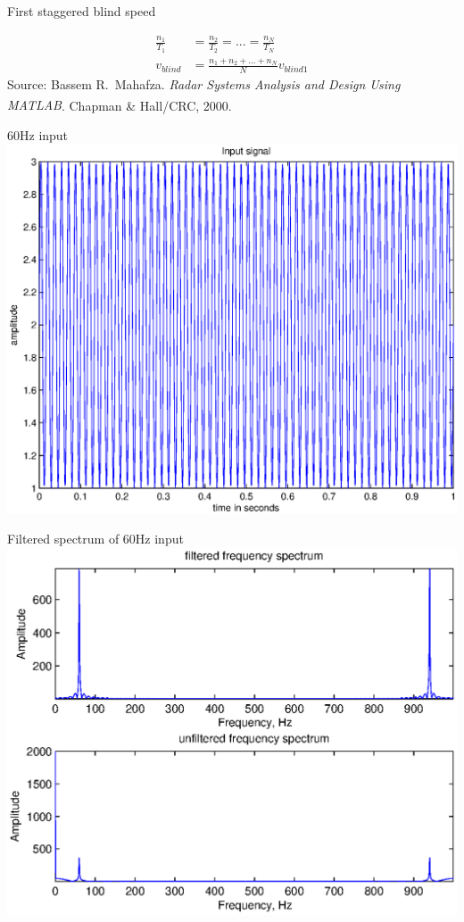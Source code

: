 \documentclass[mathserif]{beamer}
\begin{document}
    \begin{frame}{First staggered blind speed}
      \begin{minipage}[t][0.8\textheight][t]{\textwidth}
	\begin{align}
	  \frac{n_1}{T_1} & = \frac{n_2}{T_2} = ... = \frac{n_N}{T_N} \nonumber \\
	  v_{blind} & = \frac{n_1 + n_2 + ... + n_N}{N} v_{blind1} \nonumber
	\end{align}
	\vfill
	\tiny{Source: Bassem R.~Mahafza. \emph{Radar Systems Analysis and Design Using MATLAB\textsuperscript{\textregistered}}. Chapman \& Hall/CRC, 2000.}
      \end{minipage}
    \end{frame}

    
    
    \begin{frame}{60Hz input}
      \includegraphics[width=\linewidth]{inputSig60Hz}
    \end{frame}
    
    
    \begin{frame}{Filtered spectrum of 60Hz input}
      \includegraphics[width=\linewidth]{freqSpec60Hz}
    \end{frame}
\end{document}
